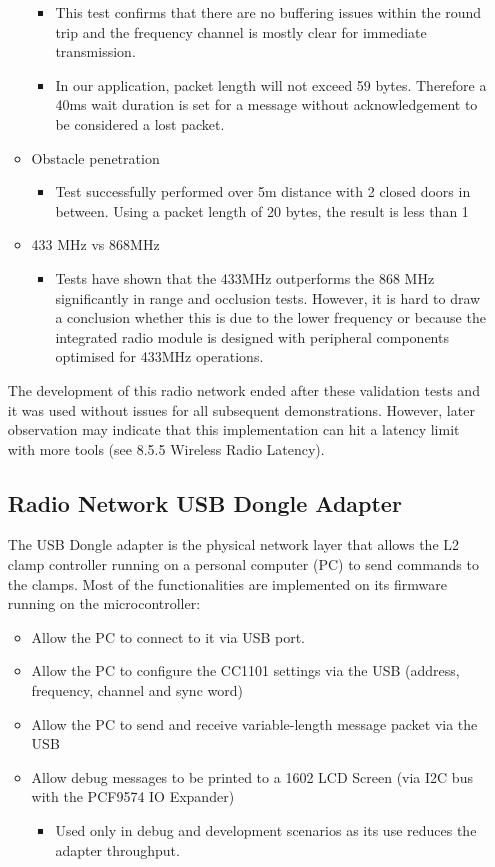 \begin{itemize}
\begin{itemize}
\begin{itemize}
    \item This test confirms that there are no buffering issues within the round trip and the frequency channel is mostly clear for immediate transmission.
    \item In our application, packet length will not exceed 59 bytes. Therefore a 40ms wait duration is set for a message without acknowledgement to be considered a lost packet.
    \end{itemize}
\item Obstacle penetration
    \begin{itemize}
    \item Test successfully performed over 5m distance with 2 closed doors in between. Using a packet length of 20 bytes, the result is less than 1%
\end{itemize}
\item 433 MHz vs 868MHz
    \begin{itemize}
\item Tests have shown that the 433MHz outperforms the 868 MHz significantly in range and occlusion tests. However, it is hard to draw a conclusion whether this is due to the lower frequency or because the integrated radio module is designed with peripheral components optimised for 433MHz operations.
    \end{itemize}
\end{itemize}

The development of this radio network ended after these validation tests and it was used without issues for all subsequent demonstrations. However, later observation may indicate that this implementation can hit a latency limit with more tools (see 8.5.5 Wireless Radio Latency).

\subsection{Radio Network USB Dongle Adapter}
The USB Dongle adapter is the physical network layer that allows the L2 clamp controller running on a personal computer (PC) to send commands to the clamps. Most of the functionalities are implemented on its firmware running on the microcontroller:
\begin{itemize}
\item Allow the PC to connect to it via USB port.
\item Allow the PC to configure the CC1101 settings via the USB (address, frequency, channel and sync word)
\item Allow the PC to send and receive variable-length message packet via the USB
\item Allow debug messages to be printed to a 1602 LCD Screen (via I2C bus with the PCF9574 IO Expander)
    \begin{itemize}
    \item Used only in debug and development scenarios as its use reduces the adapter throughput.
    \end{itemize}
\end{itemize}


\end{itemize}
